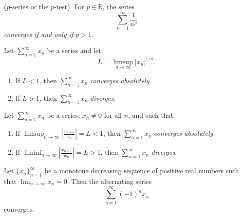 \documentclass[../main.tex]{subfiles}
\begin{document}
    
    
    
    
    
    \begin{proposition}[P-Series]\label{prp:p-series}
    ($p$-series or the $p$-test). For $p \in \mathbb{R}$, the series
    \[
    \sum_{n=1}^{\infty} \frac{1}{n^p}
    \]
    \textit{converges if and only if} $p > 1$.
    
    \end{proposition}
    
    
    
    
    
    
    
    
    \begin{proposition}\label{prp:root_test}
    Let $\sum_{n=1}^{\infty} x_n$ be a series and let
    \[
    L = \limsup_{n \to \infty} |x_n|^{1/n}.
    \]
    \begin{enumerate}
        \item If $L < 1$, then $\sum_{n=1}^{\infty} x_n$ \textit{converges absolutely}.
        \item If $L > 1$, then $\sum_{n=1}^{\infty} x_n$ \textit{diverges}.
    \end{enumerate}
    \end{proposition}
    
    
    
    
    
    
    
    \begin{proposition}\label{prp:ratio_test_Series}
    Let $\sum_{n=1}^{\infty} x_n$ be a series, $x_n \neq 0$ for all $n$, and such that
    \begin{enumerate}
        \item If $\limsup_{n \to \infty} \left| \frac{x_{n+1}}{x_n} \right|  = L < 1$, then $\sum_{n=1}^{\infty} x_n$ \textit{converges absolutely}.
        \item If $\liminf_{n \to \infty} \left| \frac{x_{n+1}}{x_n} \right|  = L > 1$, then $\sum_{n=1}^{\infty} x_n$ \textit{diverges}.
    \end{enumerate}
    \end{proposition}
    
    
    
    
    
    
    \begin{proposition}\label{prp:alt_series_test}
    Let \( \{x_n\}_{n=1}^\infty \) be a monotone decreasing sequence of positive real numbers such that \(\lim_{n \to \infty} x_n = 0\). Then the alternating series
    \[
    \sum_{n=1}^\infty (-1)^n x_n
    \]
    converges.
    \end{proposition}
    
\end{document}
